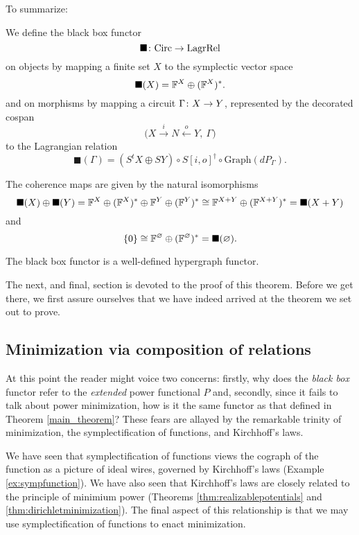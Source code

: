 To summarize:

\begin{definition}
  We define the black box functor 
  \[
    \blacksquare{\colon} \mathrm{Circ} \to \mathrm{LagrRel} 
  \]
  on objects by mapping a finite set $X$ to the symplectic vector space 
  \[
    \blacksquare(X) = {\mathbb F}^X \oplus ({\mathbb F}^X)^\ast.
  \]
  and on morphisms by mapping a circuit $\Gamma{\colon} X \to Y$, represented by the
  decorated cospan
  \[
    \big(X \stackrel{i}{\longrightarrow} N \stackrel{o}{\longleftarrow} Y,\:
    \Gamma\big)
  \]
  to the Lagrangian relation
  \[
    \blacksquare(\Gamma) = (S^t\!X \oplus SY) \circ S[i,o]^\dagger \circ
    \mathrm{Graph}(dP_\Gamma).
  \]
\end{definition}

The coherence maps are given by the natural isomorphisms
\[
  \blacksquare(X) \oplus \blacksquare(Y) = {\mathbb F}^X \oplus ({\mathbb F}^X)^\ast \oplus {\mathbb F}^Y
  \oplus ({\mathbb F}^Y)^\ast \cong {\mathbb F}^{X+Y} \oplus ({\mathbb F}^{X+Y})^\ast = \blacksquare(X+Y)
\]
and
  \[
    \{0\} \cong {\mathbb F}^\varnothing \oplus ({\mathbb F}^\varnothing)^\ast =
    \blacksquare(\varnothing).
  \]


\begin{theorem} \label{thm:main}
  The black box functor is a well-defined hypergraph functor.
\end{theorem}

The next, and final, section is devoted to the proof of this theorem. Before we
get there, we first assure ourselves that we have indeed arrived at the theorem
we set out to prove.

\subsection{Minimization via composition of relations}

At this point the reader might voice two concerns: firstly, why does the
\emph{black box} functor refer to the \emph{extended} power functional $P$ and,
secondly, since it fails to talk about power minimization, how is it the same
functor as that defined in Theorem \ref{main_theorem}? These fears are allayed
by the remarkable trinity of minimization, the symplectification of functions,
and Kirchhoff's laws. 

We have seen that symplectification of functions views the cograph of the
function as a picture of ideal wires, governed by Kirchhoff's laws (Example
\ref{ex:sympfunction}). We have also seen that Kirchhoff's laws are closely
related to the principle of minimium power (Theorems
\ref{thm:realizablepotentials} and \ref{thm:dirichletminimization}). The final
aspect of this relationship is that we may use symplectification of functions to
enact minimization.

